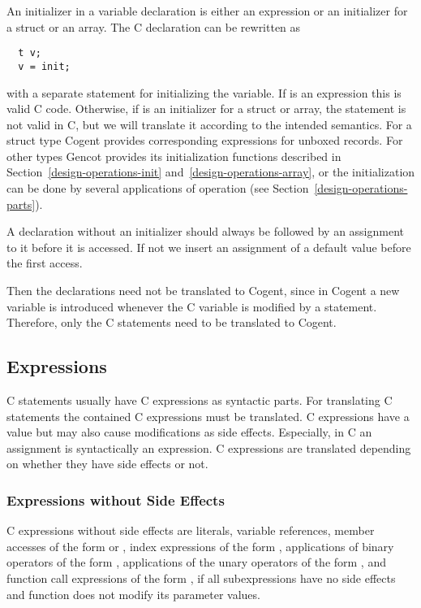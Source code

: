 An initializer  in a variable declaration  is either an expression or an initializer for
a struct or an array. The C declaration can be rewritten as
\begin{verbatim}
  t v;
  v = init;
\end{verbatim}
with a separate statement for initializing the variable. If  is an expression this is valid C code. Otherwise,
if  is an initializer for a struct or array, the statement is not valid in C, but we will translate it 
according to the intended semantics. For a struct type Cogent provides
corresponding expressions for unboxed records. For other types Gencot provides its initialization functions 
described in Section~\ref{design-operations-init} and~\ref{design-operations-array},
or the initialization can be done by several applications of operation  (see Section~\ref{design-operations-parts}).

A declaration without an initializer should always be followed by an assignment to it before it is accessed. If not
we insert an assignment of a default value before the first access.

Then the declarations need not be translated to Cogent, since in Cogent a new variable is introduced whenever
the C variable is modified by a statement. Therefore, only the C statements need to be translated to Cogent.

\subsection{Expressions}
\label{app-transfunction-expr}

C statements usually have C expressions as syntactic parts. For translating C statements the contained C expressions must be 
translated. C expressions have a value but may also cause modifications as side effects. Especially, in C an assignment
is syntactically an expression. C expressions are translated depending on whether they have side effects or not.

\subsubsection{Expressions without Side Effects}

C expressions without side effects are literals, variable references, member accesses of the form  or 
, index
expressions of the form , applications of binary operators of the form , 
applications of the unary operators \code{+,-,!,~} of the form , and function 
call expressions of the form , if all subexpressions
 have no side effects and function  does not modify its parameter values. 

